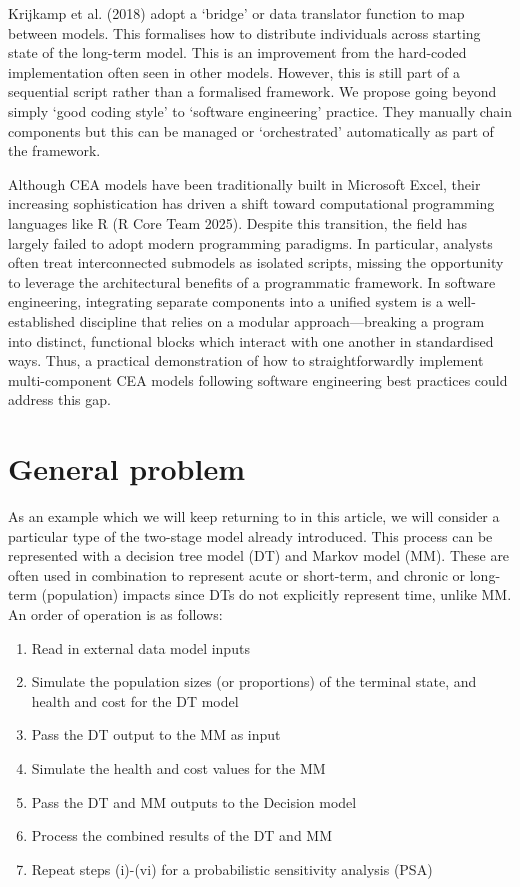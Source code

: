 \documentclass[
]{article}
\providecommand{\tightlist}{%
  \setlength{\itemsep}{0pt}\setlength{\parskip}{0pt}}
\begin{document}
Krijkamp et al. (2018) adopt a `bridge' or data translator function to
map between models. This formalises how to distribute individuals across
starting state of the long-term model. This is an improvement from the
hard-coded implementation often seen in other models. However, this is
still part of a sequential script rather than a formalised framework. We
propose going beyond simply `good coding style' to `software
engineering' practice. They manually chain components but this can be
managed or `orchestrated' automatically as part of the framework.

Although CEA models have been traditionally built in Microsoft Excel,
their increasing sophistication has driven a shift toward computational
programming languages like R (R Core Team 2025). Despite this
transition, the field has largely failed to adopt modern programming
paradigms. In particular, analysts often treat interconnected submodels
as isolated scripts, missing the opportunity to leverage the
architectural benefits of a programmatic framework. In software
engineering, integrating separate components into a unified system is a
well-established discipline that relies on a modular approach---breaking
a program into distinct, functional blocks which interact with one
another in standardised ways. Thus, a practical demonstration of how to
straightforwardly implement multi-component CEA models following
software engineering best practices could address this gap.

\section{General problem}\label{general-problem}

As an example which we will keep returning to in this article, we will
consider a particular type of the two-stage model already introduced.
This process can be represented with a decision tree model (DT) and
Markov model (MM). These are often used in combination to represent
acute or short-term, and chronic or long-term (population) impacts since
DTs do not explicitly represent time, unlike MM. An order of operation
is as follows:

\begin{enumerate}
\def\labelenumi{\roman{enumi}.}
\tightlist
\item
  Read in external data model inputs
\item
  Simulate the population sizes (or proportions) of the terminal state,
  and health and cost for the DT model
\item
  Pass the DT output to the MM as input
\item
  Simulate the health and cost values for the MM
\item
  Pass the DT and MM outputs to the Decision model
\item
  Process the combined results of the DT and MM
\item
  Repeat steps (i)-(vi) for a probabilistic sensitivity analysis (PSA)
\end{enumerate}
\end{document}
